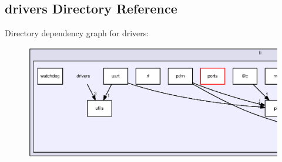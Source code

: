 \subsection{drivers Directory Reference}
\label{dir_9ed54c436094c10285761171525ba0a5}
Directory dependency graph for drivers\+:
\nopagebreak
\begin{figure}[H]
\begin{center}
\leavevmode
\includegraphics[width=350pt]{dir_9ed54c436094c10285761171525ba0a5_dep}
\end{center}
\end{figure}
